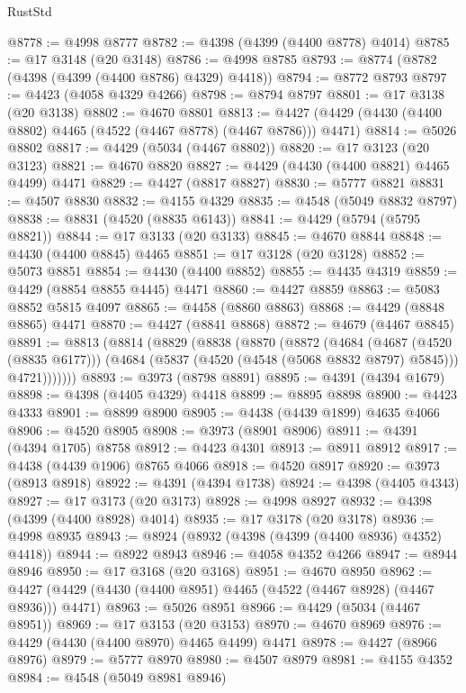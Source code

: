 \begin{lexlean}{RustStd}
\begin{coremodule}
{\begin{coremodule}
{{{{{{{{{{{{{{{{{{{{{{{{{{{{{{{{{{{{{{{{{{{{{{{{{{{{{{{{{{{{{{{{{{{{@8778 := @4998 @8777
@8782 := @4398 (@4399 (@4400 @8778) @4014)
@8785 := @17 @3148 (@20 @3148)
@8786 := @4998 @8785
@8793 := @8774 (@8782 (@4398 (@4399 (@4400 @8786) @4329) @4418))
@8794 := @8772 @8793
@8797 := @4423 (@4058 @4329 @4266)
@8798 := @8794 @8797
@8801 := @17 @3138 (@20 @3138)
@8802 := @4670 @8801
@8813 := @4427 (@4429 (@4430 (@4400 @8802) @4465 (@4522 (@4467 @8778) (@4467 @8786))) @4471)
@8814 := @5026 @8802
@8817 := @4429 (@5034 (@4467 @8802))
@8820 := @17 @3123 (@20 @3123)
@8821 := @4670 @8820
@8827 := @4429 (@4430 (@4400 @8821) @4465 @4499) @4471
@8829 := @4427 (@8817 @8827)
@8830 := @5777 @8821
@8831 := @4507 @8830
@8832 := @4155 @4329
@8835 := @4548 (@5049 @8832 @8797)
@8838 := @8831 (@4520 (@8835 @6143))
@8841 := @4429 (@5794 (@5795 @8821))
@8844 := @17 @3133 (@20 @3133)
@8845 := @4670 @8844
@8848 := @4430 (@4400 @8845) @4465
@8851 := @17 @3128 (@20 @3128)
@8852 := @5073 @8851
@8854 := @4430 (@4400 @8852)
@8855 := @4435 @4319
@8859 := @4429 (@8854 @8855 @4445) @4471
@8860 := @4427 @8859
@8863 := @5083 @8852 @5815 @4097
@8865 := @4458 (@8860 @8863)
@8868 := @4429 (@8848 @8865) @4471
@8870 := @4427 (@8841 @8868)
@8872 := @4679 (@4467 @8845)
@8891 := @8813
    (@8814
      (@8829
        (@8838
          (@8870
            (@8872
              (@4684
                (@4687 (@4520 (@8835 @6177)))
                (@4684 (@5837 (@4520 (@4548 (@5068 @8832 @8797) @5845))) @4721)))))))
@8893 := @3973 (@8798 @8891)
@8895 := @4391 (@4394 @1679)
@8898 := @4398 (@4405 @4329) @4418
@8899 := @8895 @8898
@8900 := @4423 @4333
@8901 := @8899 @8900
@8905 := @4438 (@4439 @1899) @4635 @4066
@8906 := @4520 @8905
@8908 := @3973 (@8901 @8906)
@8911 := @4391 (@4394 @1705) @8758
@8912 := @4423 @4301
@8913 := @8911 @8912
@8917 := @4438 (@4439 @1906) @8765 @4066
@8918 := @4520 @8917
@8920 := @3973 (@8913 @8918)
@8922 := @4391 (@4394 @1738)
@8924 := @4398 (@4405 @4343)
@8927 := @17 @3173 (@20 @3173)
@8928 := @4998 @8927
@8932 := @4398 (@4399 (@4400 @8928) @4014)
@8935 := @17 @3178 (@20 @3178)
@8936 := @4998 @8935
@8943 := @8924 (@8932 (@4398 (@4399 (@4400 @8936) @4352) @4418))
@8944 := @8922 @8943
@8946 := @4058 @4352 @4266
@8947 := @8944 @8946
@8950 := @17 @3168 (@20 @3168)
@8951 := @4670 @8950
@8962 := @4427 (@4429 (@4430 (@4400 @8951) @4465 (@4522 (@4467 @8928) (@4467 @8936))) @4471)
@8963 := @5026 @8951
@8966 := @4429 (@5034 (@4467 @8951))
@8969 := @17 @3153 (@20 @3153)
@8970 := @4670 @8969
@8976 := @4429 (@4430 (@4400 @8970) @4465 @4499) @4471
@8978 := @4427 (@8966 @8976)
@8979 := @5777 @8970
@8980 := @4507 @8979
@8981 := @4155 @4352
@8984 := @4548 (@5049 @8981 @8946)
}}}}}}}}}}}}}}}}}}}}}}}}}}}}}}}}}}}}}}}}}}}}}}}}}}}}}}}}}}}}}}}}}}}}
\end{coremodule}}
\end{coremodule}
\end{lexlean}
